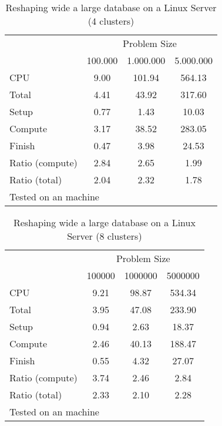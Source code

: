 \documentclass[letterpaper, 10pt]{article}
\begin{document}
\begin{table}[!h]
\centering
\caption{Reshaping wide a large database on a Linux Server (4 clusters)}
\begin{tabular}{l*{3}{c}}\hline
& \multicolumn{3}{c}{Problem Size} \\
& 100.000 &          1.000.000 &         5.000.000 \\ \hline
CPU &     9.00 &    101.94 &    564.13 \\
Total &     4.41 &     43.92 &    317.60 \\
\hspace{2mm} Setup &     0.77 &      1.43 &     10.03 \\
\hspace{2mm} Compute &     3.17 &     38.52 &    283.05 \\
\hspace{2mm} Finish &     0.47 &      3.98 &     24.53 \\
\hline Ratio (compute) &     2.84 &      2.65 &      1.99 \\
Ratio (total) &     2.04 &      2.32 &      1.78 \\
\hline
\multicolumn{4}{l}{\footnotesize Tested on an \unix1 machine}
\end{tabular}
\end{table}

\begin{table}[!h]
\centering
\caption{Reshaping wide a large database on a Linux Server (8 clusters)}
\begin{tabular}{l*{3}{c}}\hline
& \multicolumn{3}{c}{Problem Size} \\
& 100000 &         1000000 &         5000000 \\ \hline
CPU &     9.21 &     98.87 &    534.34 \\
Total &     3.95 &     47.08 &    233.90 \\
\hspace{2mm} Setup &     0.94 &      2.63 &     18.37 \\
\hspace{2mm} Compute &     2.46 &     40.13 &    188.47 \\
\hspace{2mm} Finish &     0.55 &      4.32 &     27.07 \\
\hline Ratio (compute) &     3.74 &      2.46 &      2.84 \\
Ratio (total) &     2.33 &      2.10 &      2.28 \\
\hline
\multicolumn{4}{l}{\footnotesize Tested on an \unix1 machine}
\end{tabular}
\end{table}
\end{document}

